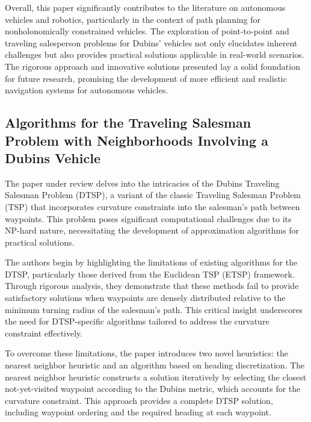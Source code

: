 \vspace*{6mm}

Overall, this paper significantly contributes to the literature on autonomous vehicles and robotics, particularly in the context of path planning for nonholonomically constrained vehicles. The exploration of point-to-point and traveling salesperson problems for Dubins’ vehicles not only elucidates inherent challenges but also provides practical solutions applicable in real-world scenarios. The rigorous approach and innovative solutions presented lay a solid foundation for future research, promising the development of more efficient and realistic navigation systems for autonomous vehicles.

\subsection{Algorithms for the Traveling Salesman Problem with Neighborhoods Involving a Dubins Vehicle}

The paper under review delves into the intricacies of the Dubins Traveling Salesman Problem (DTSP), a variant of the classic Traveling Salesman Problem (TSP) that incorporates curvature constraints into the salesman's path between waypoints. This problem poses significant computational challenges due to its NP-hard nature, necessitating the development of approximation algorithms for practical solutions.

\vspace*{6mm}

The authors begin by highlighting the limitations of existing algorithms for the DTSP, particularly those derived from the Euclidean TSP (ETSP) framework. Through rigorous analysis, they demonstrate that these methods fail to provide satisfactory solutions when waypoints are densely distributed relative to the minimum turning radius of the salesman's path. This critical insight underscores the need for DTSP-specific algorithms tailored to address the curvature constraint effectively.

\vspace*{6mm}

To overcome these limitations, the paper introduces two novel heuristics: the nearest neighbor heuristic and an algorithm based on heading discretization. The nearest neighbor heuristic constructs a solution iteratively by selecting the closest not-yet-visited waypoint according to the Dubins metric, which accounts for the curvature constraint. This approach provides a complete DTSP solution, including waypoint ordering and the required heading at each waypoint.

